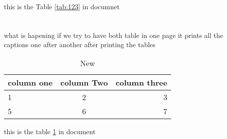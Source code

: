 \documentclass{article}
\begin{document}
this is the Table \ref{tab:123} in documnet\\\\\\
what is hapening if we try to have both table in one page 
it prints all the captions one after another after printing the tables

\newpage
\begin{table}
	\begin{tabular}{|l|c|r|}
		\hline
		{\bf column one} & \textbf{column Two} & {\bf column three} \\
		\hline
		1 & 2 & 3\\
		5 & 6 & 7\\
		\hline
	\end{tabular}
	\caption{New}
	\label{tab:456}
\end{table}

this is the table \ref{tab:456} in document

\newpage
\begin{listing}
	
\end{listing}
\newpage



\end{document}
